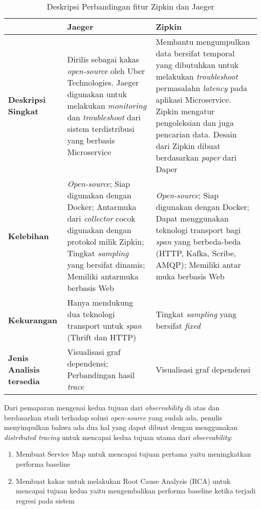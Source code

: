 \begin{small}
	\begin{longtable}{ | p{3.75cm} | p{5.5cm} | p{5.5cm} | }
		\caption{Deskripsi Perbandingan fitur Zipkin dan Jaeger}
		\label{jzipkin-comparison}                                                                                                                \\ \hline
		 & \centering\bfseries{Jaeger \citep{jaeger}} & \centering\bfseries{Zipkin \citep{zipkin}} \tabularnewline \hline
		\endfirsthead
		\bfseries{Deskripsi Singkat} & Dirilis sebagai kakas \textit{open-source} oleh Uber Technologies. Jaeger digunakan untuk melakukan \textit{monitoring} dan \textit{troubleshoot} dari sistem terdistribusi yang berbasis Microservice & Membantu mengumpulkan data bersifat temporal yang dibutuhkan untuk melakukan \textit{troubleshoot} permasalahn \textit{latency} pada aplikasi Microservice. Zipkin mengatur pengoleksian dan juga pencarian data. Desain dari Zipkin dibuat berdasarkan \textit{paper} dari Daper \citep{dapper-paper}\\ \hline
		\bfseries{Kelebihan} &  \textit{Open-source}; 
		Siap digunakan dengan Docker; Antarmuka dari \textit{collector} cocok digunakan dengan protokol milik Zipkin; Tingkat \textit{sampling} yang bersifat dinamis; Memiliki antarmuka berbasis Web &  \textit{Open-source}; 
		Siap digunakan dengan Docker; Dapat menggunakan teknologi transport bagi \textit{span} yang berbeda-beda (HTTP, Kafka, Scribe, AMQP); Memiliki antar muka berbasis Web  \\ \hline
		\bfseries{Kekurangan} & Hanya mendukung dua teknologi transport untuk \textit{span} (Thrift dan HTTP) & Tingkat \textit{sampling} yang bersifat \textit{fixed} \\ \hline
		\bfseries{Jenis Analisis tersedia} & Visualisasi graf dependensi; Perbandingan hasil \textit{trace} & Visualisasi graf dependensi \\ \hline
	\end{longtable}
\end{small}

Dari pemaparan mengenai kedua tujuan dari \textit{observability} di atas dan berdasarkan studi terhadap solusi \textit{open-source} yang sudah ada, penulis menyimpulkan bahwa ada dua hal yang dapat dibuat dengan menggunakan \textit{distributed tracing} untuk mencapai kedua tujuan utama dari \textit{observability}:
\begin{enumerate}
	\item Membuat Service Map untuk mencapai tujuan pertama yaitu meningkatkan performa baseline
	\item Membuat kakas untuk melakukan Root Cause Analysis (RCA) untuk mencapai tujuan kedua yaitu mengembalikan performa baseline ketika terjadi regresi pada sistem
\end{enumerate}


